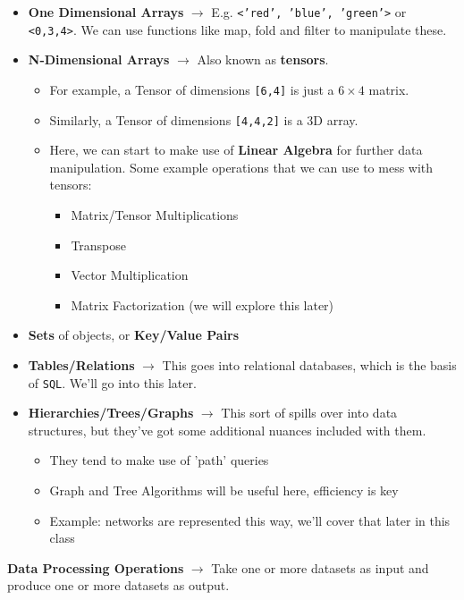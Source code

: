 \documentclass[english, 10pt]{article}
\begin{document}
\begin{itemize}
	\item \textbf{One Dimensional Arrays} $\rightarrow$ E.g. \texttt{<'red', 'blue', 'green'>} or \texttt{<0,3,4>}. We can use functions like map, fold and filter to manipulate these.
	\item \textbf{N-Dimensional Arrays} $\rightarrow$ Also known as \textbf{tensors}.
	\begin{itemize}
		\item For example, a Tensor of dimensions \texttt{[6,4]} is just a $6\times 4$ matrix.
		\item Similarly, a Tensor of dimensions \texttt{[4,4,2]} is a 3D array.
		\item Here, we can start to make use of \textbf{Linear Algebra} for further data manipulation. Some example operations that we can use to mess with tensors:
		\begin{itemize}
			\item Matrix/Tensor Multiplications
			\item Transpose
			\item Vector Multiplication
			\item Matrix Factorization (we will explore this later)
		\end{itemize}
	\end{itemize}
	\item \textbf{Sets} of objects, or \textbf{Key/Value Pairs}
	\item \textbf{Tables/Relations} $\rightarrow$ This goes into relational databases, which is the basis of \texttt{SQL}. We'll go into this later.
	\item \textbf{Hierarchies/Trees/Graphs} $\rightarrow$ This sort of spills over into data structures, but they've got some additional nuances included with them.
	\begin{itemize}
		\item They tend to make use of 'path' queries
		\item Graph and Tree Algorithms will be useful here, efficiency is key
		\item Example: networks are represented this way, we'll cover that later in this class
	\end{itemize}
\end{itemize}
\begin{tcolorbox}[title=Definition:,colframe=red!75!black,colback=red!5!white,arc=0pt,fonttitle=\bfseries]
	\textbf{Data Processing Operations} $\rightarrow$ Take one or more datasets as input and produce one or more datasets as output.
	\end{tcolorbox}
\end{document}
